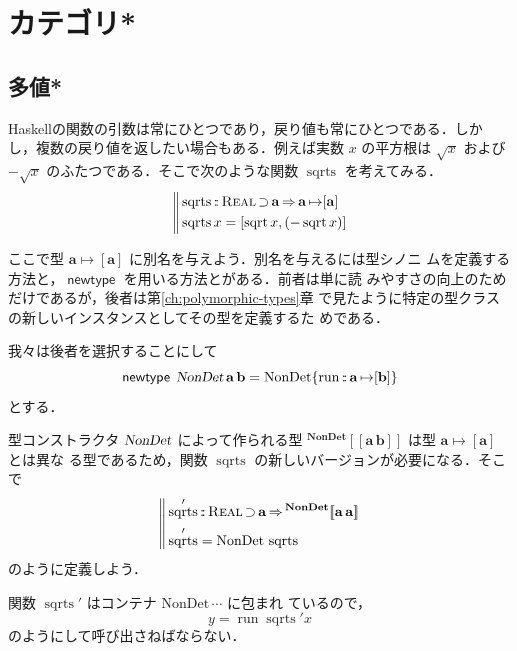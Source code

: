\documentclass[a5paper,twoside,fleqn,draft]{jsbook}
\def\[{[\![}
\def\]{]\!]}
\newcommand{\programminglanguage}[1]{\textsf{#1}}
\newcommand{\haskell}{\programminglanguage{Haskell}}
\newcommand{\mBrace}{\Vert}
\newcommand{\mKeyword}[1]{\mathsf{#1}}
\newcommand{\mNewTypeDeclKeyword}{\mKeyword{newtype}}
\DeclareMathOperator{\mNewTypeDecl}{\mNewTypeDeclKeyword}
\DeclareMathOperator{\mSuperClass}{\Rightarrow}
\DeclareMathOperator{\mSuperSet}{\supset}
\newcommand{\mSpecialFunc}[1]{#1}
\DeclareMathOperator{\mRun}{\mSpecialFunc{run}}
\DeclareMathOperator{\mSqrt}{\mSpecialFunc{sqrt}}
\DeclareMathOperator{\mSqrts}{\mSpecialFunc{sqrts}}
\DeclareMathOperator{\mIn}{{:\!:}}
\DeclareMathOperator{\mMapsTo}{\mapsto}
\newcommand{\mType}[1]{\mathbf{#1}} %
\newcommand{\mA}{\mType{a}}
\newcommand{\mB}{\mType{b}}
\newcommand{\mTypeAssemble}[2]{{}^\mType{#1}\[\mType{#2}\]}
\newcommand{\mTypeConstructor}[1]{\textsl{#1}}
\newcommand{\mValueConstructor}[1]{\mathrm{#1}}
\newcommand{\mValueWith}[2]{\mValueConstructor{#1}\,#2}
\newcommand{\mValueRecordBeginWith}[1]{\mValueConstructor{#1}\{}
\newcommand{\mValueRecordEnd}{\}}
\newcommand{\mValueRecordWith}[2]{\mValueRecordBeginWith{#1}{#2}\mValueRecordEnd}
\newcommand{\mTypeClass}[1]{\textsc{#1}} %
\newcommand{\mRealTypeClass}{\mTypeClass{Real}}
\begin{document}
\chapter{カテゴリ*}
\label{ch:category}

\section{多値*}

\haskell の関数の引数は常にひとつであり，戻り値も常にひとつである．しか
し，複数の戻り値を返したい場合もある．例えば実数 $x$ の平方根は
$\sqrt{x}$ および $-\sqrt{x}$ のふたつである．そこで次のような関数
$\mSqrts$ を考えてみる．
\begin{equation}
  \left\mBrace
  \begin{aligned}
    &\mSqrts\mIn{}\mRealTypeClass\mSuperSet\mA \mSuperClass
    \mA\mMapsTo[\mA]\\
    &\mSqrts x=[\mSqrt x,(-\mSqrt x)]
  \end{aligned}
  \right.
\end{equation}

ここで型 $\mA\mMapsTo[\mA]$ に別名を与えよう．別名を与えるには型シノニ
ムを定義する方法と，$\mNewTypeDecl$ を用いる方法とがある．前者は単に読
みやすさの向上のためだけであるが，後者は第\ref{ch:polymorphic-types}章
で見たように特定の型クラスの新しいインスタンスとしてその型を定義するた
めである．

我々は後者を選択することにして
\begin{equation}
  \mNewTypeDecl\;
  \mTypeConstructor{NonDet}\,\mA\,\mB
  =\mValueRecordWith{NonDet}{\mRun\mIn\mA\mMapsTo[\mB]}
\end{equation}
とする．

型コンストラクタ $\mTypeConstructor{NonDet}$ によって作られる型
$\mTypeAssemble{NonDet}{\mA\,\mB}$ は型 $\mA\mMapsTo[\mA]$ とは異な
る型であるため，関数 $\mSqrts$ の新しいバージョンが必要になる．そこで
\begin{equation}
  \left\mBrace
  \begin{aligned}
    &\mSqrts'
    \mIn\mRealTypeClass\mSuperSet\mA
    \mSuperClass\mTypeAssemble{NonDet}{\mA\,\mA}\\
    &\mSqrts'
    =\mValueWith{NonDet}{\mSqrts}
  \end{aligned}
  \right.
\end{equation}
のように定義しよう．

関数 $\mSqrts'$ はコンテナ $\mValueWith{NonDet}{\dotsb}$ に包まれ
ているので，
\begin{equation}
  y=\mRun\mSqrts'x
\end{equation}
のようにして呼び出さねばならない．
\end{document}
